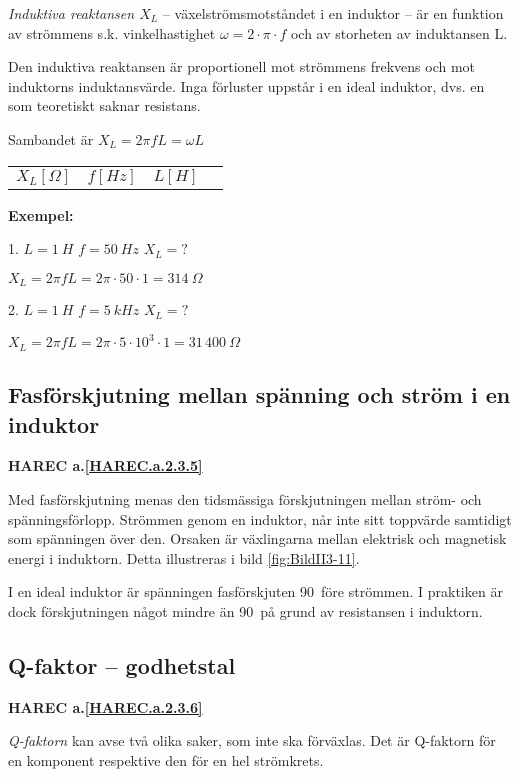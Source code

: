 \emph{Induktiva reaktansen \(X_L\)} -- växelströmsmotståndet i en induktor -- är
en funktion av strömmens s.k. vinkelhastighet \(\omega = 2 \cdot \pi  \cdot f\)
och av storheten av induktansen L.

Den induktiva reaktansen är proportionell mot strömmens frekvens och mot
induktorns induktansvärde. Inga förluster uppstår i en ideal induktor, dvs. en
som teoretiskt saknar resistans.

Sambandet är
\(X_L = 2\pi fL = \omega L\)

\begin{tabular}{llll}
 \(X_L [\Omega]\) & \(f [Hz]\) & \(L [H]\)
 \end{tabular}

\textbf{Exempel:}

1. \(L = 1\ H\) \(f = 50\ Hz\) \(X_L = ?\)

\(X_L = 2\pi fL = 2\pi  \cdot 50 \cdot 1 = 314\ \Omega\)

2. \(L = 1\ H\) \(f = 5\ kHz\) \(X_L = ?\)

\(X_L = 2\pi fL = 2\pi  \cdot 5 \cdot 10^3 \cdot 1 = 31\, 400\ \Omega\)

\subsection{Fasförskjutning mellan spänning och ström i en induktor}
\textbf{HAREC a.\ref{HAREC.a.2.3.5}\label{myHAREC.a.2.3.5}}

Med fasförskjutning menas den tidsmässiga förskjutningen mellan ström- och
spänningsförlopp. Strömmen genom en induktor, når inte sitt toppvärde samtidigt
som spänningen över den. Orsaken är växlingarna mellan elektrisk och magnetisk
energi i induktorn.
Detta illustreras i bild \ref{fig:BildII3-11}.

I en ideal induktor är spänningen fasförskjuten 90\degree~före strömmen.
I praktiken är dock förskjutningen något mindre än 90\degree~på grund av
resistansen i induktorn.

\subsection{Q-faktor -- godhetstal}
\textbf{HAREC a.\ref{HAREC.a.2.3.6}\label{myHAREC.a.2.3.6}}

\emph{Q-faktorn} kan avse två olika saker, som inte ska förväxlas.
Det är Q-faktorn för en komponent respektive den för en hel strömkrets.

